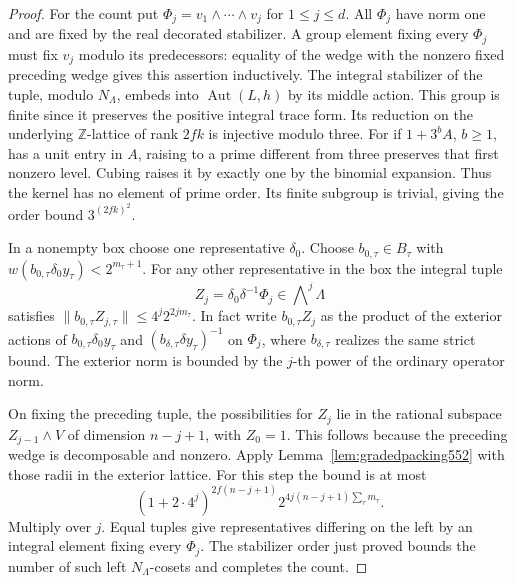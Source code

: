 \documentclass[a4paper,11pt]{article}
\theoremstyle{definition}
\theoremstyle{remark}
\newcommand{\ZZ}{\mathbb Z}\newcommand{\ord}{\operatorname{ord}}
\numberwithin{equation}{section}
\begin{document}
\begin{proof}
For the count put \(\Phi_j=v_1\wedge\cdots\wedge v_j\) for
\(1\le j\le d\). All \(\Phi_j\) have norm one and are fixed
by the real decorated stabilizer. A group element fixing every
\(\Phi_j\) must fix \(v_j\) modulo its predecessors: equality
of the wedge with the nonzero fixed preceding wedge gives
this assertion inductively. The integral stabilizer of the
tuple, modulo \(N_\Lambda\), embeds into
\(\operatorname{Aut}(L,h)\) by its middle action. This group
is finite since it preserves the positive integral trace form.
Its reduction on the underlying \(\ZZ\)-lattice of rank \(2fk\)
is injective modulo three. For if \(1+3^b A\), \(b\ge1\), has
a unit entry in \(A\), raising to a prime different from
three preserves that first nonzero level. Cubing raises it
by exactly one by the binomial expansion. Thus the kernel has
no element of prime order. Its finite subgroup is trivial,
giving the order bound \(3^{(2fk)^2}\).

In a nonempty box choose one representative \(\delta_0\).
Choose \(b_{0,\tau}\in B_\tau\) with
\(w(b_{0,\tau}\delta_0 y_\tau)<2^{m_\tau+1}\).
For any other representative in the box the integral tuple
\[
                Z_j=\delta_0\delta^{-1}\Phi_j
                        \in\bigwedge\nolimits^j\Lambda
\]
satisfies \(\|b_{0,\tau}Z_{j,\tau}\|\le 4^j2^{2jm_\tau}\).
In fact write \(b_{0,\tau}Z_j\) as the product of the exterior
actions of \(b_{0,\tau}\delta_0 y_\tau\) and
\((b_{\delta,\tau}\delta y_\tau)^{-1}\) on \(\Phi_j\),
where \(b_{\delta,\tau}\) realizes the same strict bound.
The exterior norm is bounded by the \(j\)-th power of the
ordinary operator norm.

On fixing the preceding tuple, the possibilities for \(Z_j\)
lie in the rational subspace \(Z_{j-1}\wedge V\) of dimension
\(n-j+1\), with \(Z_0=1\). This follows because the preceding
wedge is decomposable and nonzero. Apply
Lemma~\ref{lem:gradedpacking552} with those radii in the
exterior lattice. For this step the bound is at most
\[
 (1+2\cdot4^j)^{2f(n-j+1)}
                  2^{4j(n-j+1)\sum_\tau m_\tau}.
\]
Multiply over \(j\). Equal tuples give representatives differing
on the left by an integral element fixing every \(\Phi_j\).
The stabilizer order just proved bounds the number of such
left \(N_\Lambda\)-cosets and completes the count.
\end{proof}
\end{document}

